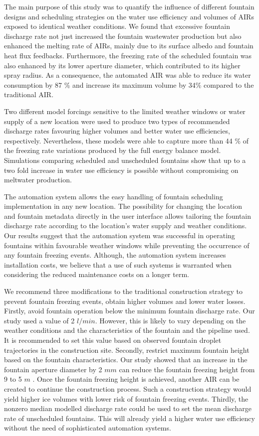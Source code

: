 \documentclass[tc, manuscript]{copernicus}
\begin{document}
The main purpose of this study was to quantify the influence of different fountain designs and scheduling
strategies on the water use efficiency and volumes of AIRs exposed to identical weather conditions. We found
that excessive fountain discharge rate not just increased the fountain wastewater production but also enhanced
the melting rate of AIRs, mainly due to its surface albedo and fountain heat flux feedbacks. Furthermore, the
freezing rate of the scheduled fountain was also enhanced by its lower aperture diameter, which contributed to
its higher spray radius. As a consequence, the automated AIR was able to reduce its water consumption by 87 \%
and increase its maximum volume by 34\% compared to the traditional AIR.

Two different model forcings sensitive to the limited weather windows or water supply of a new location were
used to produce two types of recommended discharge rates favouring higher volumes and better water use
efficiencies, respectively. Nevertheless, these models were able to capture more than 44 \% of the freezing rate
variations produced by the full energy balance model. Simulations comparing scheduled and unscheduled fountains
show that up to a two fold increase in water use efficiency is possible without compromising on meltwater
production.

The automation system allows the easy handling of fountain scheduling implementation in any new location. The
possibility for changing the location and fountain metadata directly in the user interface allows tailoring the
fountain discharge rate according to the location's water supply and weather conditions. Our results suggest
that the automation system was successful in operating fountains within favourable weather windows while
preventing the occurrence of any fountain freezing events. Although, the automation system increases
installation costs, we believe that a use of such systems is warranted when considering the reduced maintenance
costs on a longer term.

We recommend three modifications to the traditional construction strategy to prevent fountain freezing events,
obtain higher volumes and lower water losses. Firstly, avoid fountain operation below the minimum fountain
discharge rate. Our study used a value of 2 $l/min$. However, this is likely to vary depending on the weather
conditions and the characteristics of the fountain and the pipeline used. It is recommended to set this value
based on observed fountain droplet trajectories in the construction site. Secondly, restrict maximum fountain
height based on the fountain characteristics. Our study showed that an increase in the fountain aperture
diameter by 2 $mm$ can reduce the fountain freezing height from 9 to 5 $m$ . Once the fountain freezing height
is achieved, another AIR can be created to continue the construction process. Such a construction strategy would
yield higher ice volumes with lower risk of fountain freezing events.  Thirdly, the nonzero median modelled
discharge rate could be used to set the mean discharge rate of unscheduled fountains. This will already yield a
higher water use efficiency without the need of sophisticated automation systems.
\end{document}
